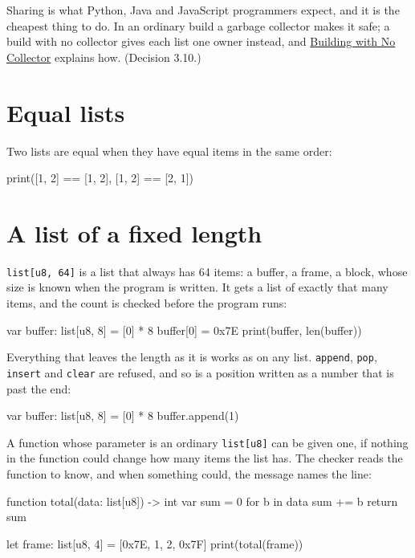\begin{why}
Sharing is what Python, Java and JavaScript programmers expect, and it
is the cheapest thing to do. In an ordinary build a garbage collector
makes it safe; a build with no collector gives each list one owner
instead, and \hyperref[ch-no-collector]{Building with No Collector}
explains how. (Decision 3.10.)
\end{why}

\section{Equal lists}

Two lists are equal when they have equal items in the same order:

\begin{zeno}
print([1, 2] == [1, 2], [1, 2] == [2, 1])
\end{zeno}

\section{A list of a fixed length}

\verb|list[u8, 64]| is a list that always has 64 items: a buffer, a
frame, a block, whose size is known when the program is written. It
gets a list of exactly that many items, and the count is checked
before the program runs:

\begin{zeno}
var buffer: list[u8, 8] = [0] * 8
buffer[0] = 0x7E
print(buffer, len(buffer))
\end{zeno}

Everything that leaves the length as it is works as on any list.
\verb|append|, \verb|pop|, \verb|insert| and \verb|clear| are
refused, and so is a position written as a number that is past the end:

\begin{zeno}[fails=yes]
var buffer: list[u8, 8] = [0] * 8
buffer.append(1)
\end{zeno}

A function whose parameter is an ordinary \verb|list[u8]| can be given
one, if nothing in the function could change how many items the list
has. The checker reads the function to know, and when something could,
the message names the line:

\begin{zeno}
function total(data: list[u8]) -> int {
    var sum = 0
    for b in data {
        sum += b
    }
    return sum
}

let frame: list[u8, 4] = [0x7E, 1, 2, 0x7F]
print(total(frame))
\end{zeno}

